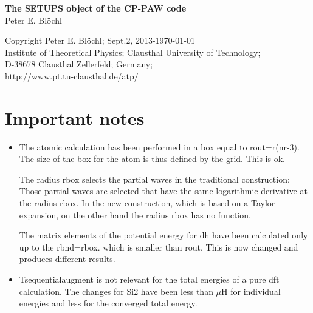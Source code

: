 \documentclass[11pt,a4paper]{report}
\begin{document}
\begin{titlepage}
\begin{center}
\vspace*{3.5cm}
{\huge \textbf{The SETUPS object of the CP-PAW code}}\\
\vspace{0.5cm}
{\large Peter E. Bl\"ochl}
\vspace{0.5cm} 
\end{center}

\vfill
\begin{center}
Copyright Peter E. Bl\"ochl; Sept.2, 2013-\today\\
{\small
Institute of Theoretical Physics;
Clausthal University of Technology;\\ 
D-38678 Clausthal Zellerfeld; Germany;\\
http://www.pt.tu-clausthal.de/atp/}
\end{center}
\end{titlepage}
\noindent            
\tableofcontents
\section{Important notes}
\begin{itemize}
\item The atomic calculation has been performed in a box equal to
  rout=r(nr-3). The size of the box for the atom is thus defined by the
  grid. This is ok.

  The radius rbox selects the partial waves in the traditional
  construction: Those partial waves are selected that have the same
  logarithmic derivative at the radius rbox. In the new construction,
  which is based on a Taylor expansion, on the other hand the radius
  rbox has no function.

  The matrix elements of the potential energy for dh have been
  calculated only up to the rbnd=rbox. which is smaller than rout.
  This is now changed and produces different results.
%
\item Tsequentialaugment is not relevant for the total energies of a
  pure dft calculation. The changes for Si2 have been less than $\mu$H
  for individual energies and less for the converged total energy.

\end{itemize}

\end{document}
